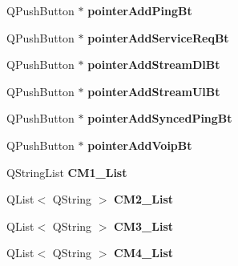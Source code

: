 \begin{DoxyCompactItemize}
\item 
Q\+Push\+Button $\ast$ {\bfseries pointer\+Add\+Ping\+Bt}\hypertarget{class_custommodels_af75409547aa4286348c4044a3f017a4d}{}\label{class_custommodels_af75409547aa4286348c4044a3f017a4d}

\item 
Q\+Push\+Button $\ast$ {\bfseries pointer\+Add\+Service\+Req\+Bt}\hypertarget{class_custommodels_a0e1c82a4913fc81649d9cd7958b5bb1c}{}\label{class_custommodels_a0e1c82a4913fc81649d9cd7958b5bb1c}

\item 
Q\+Push\+Button $\ast$ {\bfseries pointer\+Add\+Stream\+Dl\+Bt}\hypertarget{class_custommodels_a43d0543612d6d43fa90e95118e542a77}{}\label{class_custommodels_a43d0543612d6d43fa90e95118e542a77}

\item 
Q\+Push\+Button $\ast$ {\bfseries pointer\+Add\+Stream\+Ul\+Bt}\hypertarget{class_custommodels_afa5ad2ec1cf1bfbfa38c9d21ce7fda8b}{}\label{class_custommodels_afa5ad2ec1cf1bfbfa38c9d21ce7fda8b}

\item 
Q\+Push\+Button $\ast$ {\bfseries pointer\+Add\+Synced\+Ping\+Bt}\hypertarget{class_custommodels_aefd69e1f9763db3ac075a1986cbd3411}{}\label{class_custommodels_aefd69e1f9763db3ac075a1986cbd3411}

\item 
Q\+Push\+Button $\ast$ {\bfseries pointer\+Add\+Voip\+Bt}\hypertarget{class_custommodels_aa7bef44ede049f6dd08f900bc9435784}{}\label{class_custommodels_aa7bef44ede049f6dd08f900bc9435784}

\item 
Q\+String\+List {\bfseries C\+M1\+\_\+\+List}\hypertarget{class_custommodels_a9b6abae5e606a026389c0ebc7ab88775}{}\label{class_custommodels_a9b6abae5e606a026389c0ebc7ab88775}

\item 
Q\+List$<$ Q\+String $>$ {\bfseries C\+M2\+\_\+\+List}\hypertarget{class_custommodels_ad0606e9591dcadec8a3eef261f12c5f4}{}\label{class_custommodels_ad0606e9591dcadec8a3eef261f12c5f4}

\item 
Q\+List$<$ Q\+String $>$ {\bfseries C\+M3\+\_\+\+List}\hypertarget{class_custommodels_aa5dfad28062619f428d5ad652548e153}{}\label{class_custommodels_aa5dfad28062619f428d5ad652548e153}

\item 
Q\+List$<$ Q\+String $>$ {\bfseries C\+M4\+\_\+\+List}\hypertarget{class_custommodels_a988b8faa6efefda93d4fb25464bd81d3}{}\label{class_custommodels_a988b8faa6efefda93d4fb25464bd81d3}


\end{DoxyCompactItemize}
